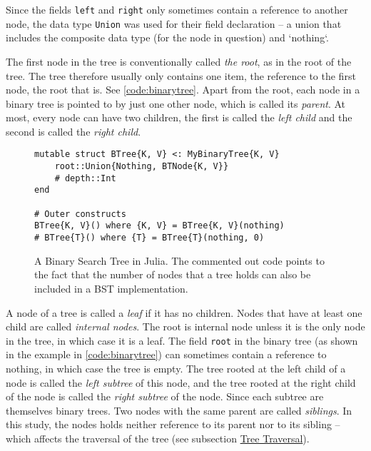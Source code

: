 \documentclass[a4paper, 11pt]{article}
\begin{document}
    Since the fields \texttt{left} and \texttt{right} only sometimes 
    contain a reference to another node, the data type \texttt{Union} was used for their 
    field declaration -- a union that includes the composite
    data type (for the node in question) and `nothing`.

    The first node in the tree is conventionally called \emph{the root}, as in the root of the tree.
    The tree therefore usually only contains one item, the reference to the first node, the root that is.
    See \autoref{code:binarytree}. Apart from the root, 
    each node in a binary tree is pointed to by just one other node, which is called its \emph{parent}. 
    At most, every node can have two children, the first is called the \emph{left child}
    and the second is called the \emph{right child}.  
    
    \begin{figure}[H]
        \centering
    \begin{verbatim}
mutable struct BTree{K, V} <: MyBinaryTree{K, V}
    root::Union{Nothing, BTNode{K, V}}
    # depth::Int
end

# Outer constructs
BTree{K, V}() where {K, V} = BTree{K, V}(nothing)
# BTree{T}() where {T} = BTree{T}(nothing, 0)
    \end{verbatim}
    \caption{A Binary Search Tree in Julia.
    The commented out code points to the fact that the number of nodes that a tree holds can also be
    included in a BST implementation.}
    \label{code:binarytree}
    \end{figure}

    A node of a tree is called a \emph{leaf} if it has no children. Nodes that
    have at least one child are called \emph{internal nodes}. 
    The root is internal node unless it is the only node in the tree, in which case it is a leaf. 
    The field \texttt{root} in the binary tree (as shown in the
    example in \autoref{code:binarytree})
    can sometimes contain a reference to nothing, in which case the tree is empty.
    The tree rooted at the left child
    of a node is called the \emph{left subtree} of this node, and the tree rooted at the
    right child of the node is called the \emph{right subtree} of the node.
    Since each subtree are themselves binary trees. Two nodes with the same 
    parent are called \emph{siblings}. In this study, the nodes holds neither reference to its parent 
    nor to its sibling -- which affects the traversal of the tree 
    (see subsection \hyperref[sec:treetraversal]{Tree Traversal}).
\end{document}
